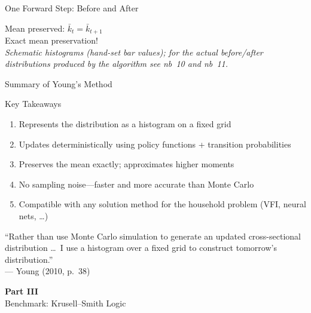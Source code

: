 \documentclass[aspectratio=169,11pt]{beamer}
\newcommand{\emphc}[1]{\textcolor{harvardcrimson}{#1}}
\begin{document}
\begin{frame}{One Forward Step: Before and After}
\vspace{0.3em}
\begin{center}
\tiny
Mean preserved: $\bar{k}_t = \bar{k}_{t+1}$\\[1pt]
\emphc{Exact mean preservation!}\\[1pt]
\emph{Schematic histograms (hand-set bar values); for the actual before/after distributions produced by the algorithm see nb~10 and nb~11.}
\end{center}
\end{frame}

\begin{frame}{Summary of Young's Method}
\begin{block}{Key Takeaways}
\begin{enumerate}
    \item Represents the distribution as a \emphc{histogram} on a fixed grid
    \item Updates \emphc{deterministically} using policy functions + transition probabilities
    \item Preserves the \emphc{mean exactly}; approximates higher moments
    \item \emphc{No sampling noise}---faster and more accurate than Monte Carlo
    \item Compatible with \emphc{any} solution method for the household problem (VFI, neural nets, \ldots)
\end{enumerate}
\end{block}

\vspace{0.5em}
\begin{center}
{\small ``Rather than use Monte Carlo simulation to generate an updated cross-sectional distribution \ldots\ I use a histogram over a fixed grid to construct tomorrow's distribution.''\\
--- Young (2010, p.~38)}
\end{center}
\end{frame}


\begin{frame}{}
\vfill
\begin{center}
{\Huge \textcolor{uzhblue}{\textbf{Part III}}}\\[12pt]
{\LARGE Benchmark: Krusell--Smith Logic}
\end{center}
\vfill
\end{frame}
\end{document}
